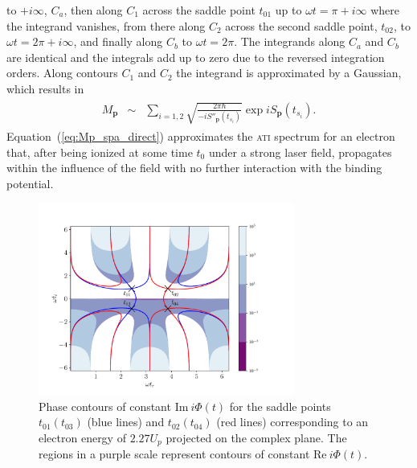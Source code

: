 to $+i\infty$, $C_{a}$, then along $C_{1}$ across the saddle point
$t_{01}$ up to $\omega t = \pi + i\infty$ where the integrand
vanishes, from there along $C_{2}$ across the second saddle point,
$t_{02}$, to $\omega t = 2\pi + i\infty$, and finally along $C_{b}$ to
$\omega t = 2\pi$. The integrands along $C_{a}$ and $C_{b}$ are
identical and the integrals add up to zero due to the reversed
integration orders. Along contours $C_{1}$ and $C_{2}$ the integrand
is approximated by a Gaussian, which results in~\cite{phd_Kopold}
\begin{eqnarray}
  \label{eq:Mp_spa_direct}
  \begin{split}
    M_{\mathbf{p}} & \sim & \sum\limits_{i = 1,2}
    \sqrt{\frac{2\pi\hbar}{-i S''_{\mathbf{p}}(t_{s_{i}})}}
    \exp iS_{\mathbf{p}}(t_{s_{i}}).
  \end{split}
\end{eqnarray}
%
Equation~(\ref{eq:Mp_spa_direct}) approximates the \textsc{ati}
spectrum for an electron that, after being ionized at some time
$t_{0}$ under a strong laser field, propagates within the influence of
the field with no further interaction with the binding potential.

\begin{figure}
  \centering
  \includegraphics[width = 0.75\textwidth]{figures/ch_ATI_SPA/direct/phase_contour12}
  \caption{Phase contours of constant $\mathrm{Im}\ i\Phi(t)$ for the
    saddle points $t_{01}(t_{03})$ (blue lines) and $t_{02}(t_{04})$
    (red lines) corresponding to an electron energy of $2.27 U_{p}$
    projected on the complex plane. The regions in a purple scale
    represent contours of constant $\mathrm{Re}\ i\Phi(t)$.}
  \label{fig:sp_contours}
\end{figure}

